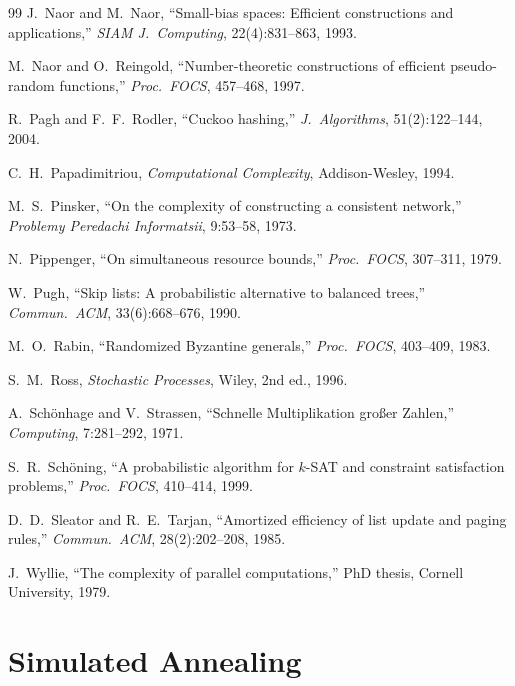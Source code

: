 \documentclass[twoside,12pt]{book}
\theoremstyle{plain}
\theoremstyle{definition}
\theoremstyle{remark}
\begin{document}
\begin{thebibliography}{99}
J.~Naor and M.~Naor,
``Small-bias spaces: Efficient constructions and applications,''
\textit{SIAM J.~Computing}, 22(4):831--863, 1993.

M.~Naor and O.~Reingold,
``Number-theoretic constructions of efficient pseudo-random functions,''
\textit{Proc.~FOCS}, 457--468, 1997.

R.~Pagh and F.~F.~Rodler,
``Cuckoo hashing,''
\textit{J.~Algorithms}, 51(2):122--144, 2004.

C.~H.~Papadimitriou,
\textit{Computational Complexity},
Addison-Wesley, 1994.

M.~S.~Pinsker,
``On the complexity of constructing a consistent network,''
\textit{Problemy Peredachi Informatsii}, 9:53--58, 1973.

N.~Pippenger,
``On simultaneous resource bounds,''
\textit{Proc.~FOCS}, 307--311, 1979.

W.~Pugh,
``Skip lists: A probabilistic alternative to balanced trees,''
\textit{Commun.~ACM}, 33(6):668--676, 1990.

M.~O.~Rabin,
``Randomized Byzantine generals,''
\textit{Proc.~FOCS}, 403--409, 1983.

S.~M.~Ross,
\textit{Stochastic Processes},
Wiley, 2nd ed., 1996.

A.~Sch\"{o}nhage and V.~Strassen,
``Schnelle Multiplikation gro{\ss}er Zahlen,''
\textit{Computing}, 7:281--292, 1971.

S.~R.~Sch\"{o}ning,
``A probabilistic algorithm for $k$-SAT and constraint satisfaction problems,''
\textit{Proc.~FOCS}, 410--414, 1999.

D.~D.~Sleator and R.~E.~Tarjan,
``Amortized efficiency of list update and paging rules,''
\textit{Commun.~ACM}, 28(2):202--208, 1985.

J.~Wyllie,
``The complexity of parallel computations,''
PhD thesis, Cornell University, 1979.

\end{thebibliography}

\chapter{Simulated Annealing}
\label{ch:simulated-annealing}
\end{document}
